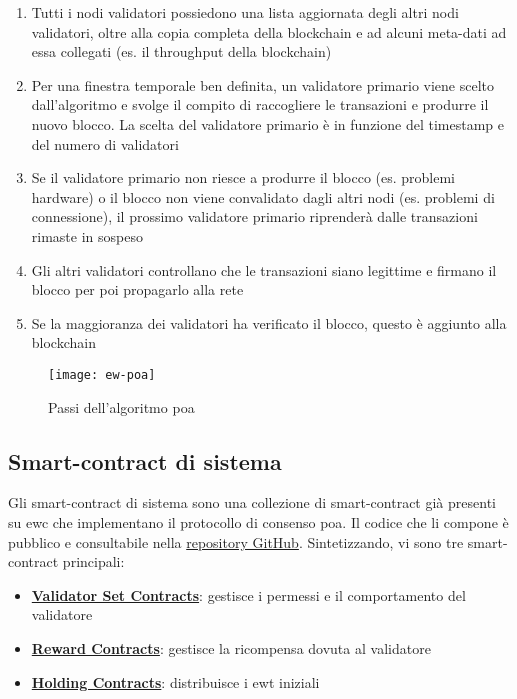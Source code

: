 \begin{enumerate}
    \item Tutti i nodi validatori possiedono una lista aggiornata degli altri nodi validatori, oltre alla copia completa della blockchain e ad alcuni meta-dati ad essa collegati (es. il throughput della blockchain)
    \item Per una finestra temporale ben definita, un validatore primario viene scelto dall'algoritmo e svolge il compito di raccogliere le transazioni e produrre il nuovo blocco. La scelta del validatore primario è in funzione del timestamp e del numero di validatori
    \item Se il validatore primario non riesce a produrre il blocco (es. problemi hardware) o il blocco non viene convalidato dagli altri nodi (es. problemi di connessione), il prossimo validatore primario riprenderà dalle transazioni rimaste in sospeso
    \item Gli altri validatori controllano che le transazioni siano legittime e firmano il blocco per poi propagarlo alla rete
    \item Se la maggioranza dei validatori ha verificato il blocco, questo è aggiunto alla blockchain
\end{enumerate}


\begin{figure}[ht]
    \texttt{[image: ew-poa]}
    \centering
    \caption{Passi dell'algoritmo \gls{poa} \cite{img:ew-poa}}
    \label{lab:ew-poa}
\end{figure}

\subsection{Smart-contract di sistema}
Gli smart-contract di sistema sono una collezione di smart-contract già presenti su \gls{ewc} che implementano il protocollo di consenso \gls{poa}.
Il codice che li compone è pubblico e consultabile nella \href{https://github.com/energywebfoundation/ewc-system-contracts}{repository GitHub}.
Sintetizzando, vi sono tre smart-contract principali:

\begin{itemize}
    \item \href{https://energy-web-foundation.gitbook.io/energy-web/technology/the-stack/trust-layer-energy-web-chain/system-architecture/system-contracts/validator-set-contract#overview}{\textbf{Validator Set Contracts}}: gestisce i permessi e il comportamento del validatore
    \item \href{https://energy-web-foundation.gitbook.io/energy-web/technology/the-stack/trust-layer-energy-web-chain/system-architecture/system-contracts/block-reward-contract}{\textbf{Reward Contracts}}: gestisce la ricompensa dovuta al validatore
    \item \href{https://energy-web-foundation.gitbook.io/energy-web/technology/the-stack/trust-layer-energy-web-chain/system-architecture/system-contracts/holding-contract#overview}{\textbf{Holding Contracts}}: distribuisce i \gls{ewt} iniziali
\end{itemize}


